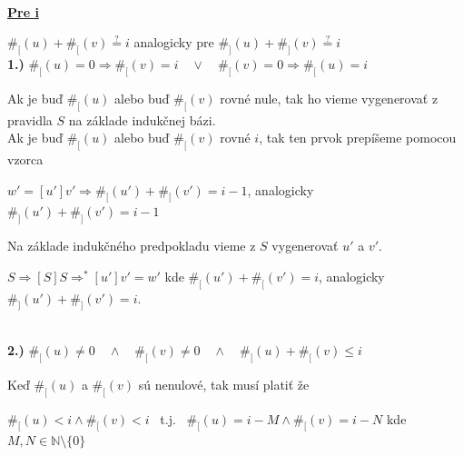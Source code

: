 \documentclass[11pt,a4paper]{article}
\begin{document}
\hfill\\
\underline{\textbf{Pre i}}
\begin{flushright}
\begin{minipage}{0.95\textwidth}

    $\#_{[}(u) + \#_{[}(v) \stackrel{\text{?}}{=} i$ analogicky pre $\#_{]}(u) + \#_{]}(v) \stackrel{\text{?}}{=} i$\\

    \textbf{1.)} $\#_{[}(u) = 0 \Rightarrow \#_{[}(v) = i \quad \vee \quad \#_{[}(v) = 0 \Rightarrow \#_{[}(u) = i$\\[-1em]
    \begin{flushright}
    \begin{minipage}{0.95\textwidth}
        Ak je buď $\#_{[}(u)$ alebo buď $\#_{[}(v)$ rovné nule, tak ho vieme vygenerovať z pravidla $S$ na základe indukčnej bázi.\\

        Ak je buď $\#_{[}(u)$ alebo buď $\#_{[}(v)$ rovné $i$, tak ten prvok prepíšeme pomocou vzorca

        \begin{center}
        $w'=[u']v' \Rightarrow \#_{[}(u') + \#_{[}(v') = i-1$, analogicky $\#_{]}(u') + \#_{]}(v') = i-1$
        \end{center}

        Na základe indukčného predpokladu vieme z $S$ vygenerovať $u'$ a $v'$.
        \begin{center}
        $S \Rightarrow [S]S \Rightarrow^{*} [u']v' = w'$ kde $\#_{[}(u') + \#_{[}(v') = i$, analogicky $\#_{]}(u') + \#_{]}(v') = i$.
        \end{center}
    \end{minipage}
    \end{flushright}

    \hfill\\[-1em]

    \textbf{2.)} $\#_{[}(u) \neq 0 \quad \wedge \quad \#_{[}(v) \neq 0 \quad \wedge \quad \#_{[}(u)+\#_{[}(v) \leq i$\\[-1em]
    \begin{flushright}
    \begin{minipage}{0.95\textwidth}
        Keď $\#_{[}(u)$ a $\#_{[}(v)$ sú nenulové, tak musí platiť že
        \begin{center}
        $\#_{[}(u) < i \wedge \#_{[}(v) < i$ \ t.j. \ $\#_{[}(u) = i - M \wedge \#_{[}(v) = i - N$ kde $M,N \in \mathbb{N} \setminus \{0\}$
        \end{center}
    \end{minipage}
    \end{flushright}

\end{minipage}
\end{flushright}
\hfill\\
\end{document}
